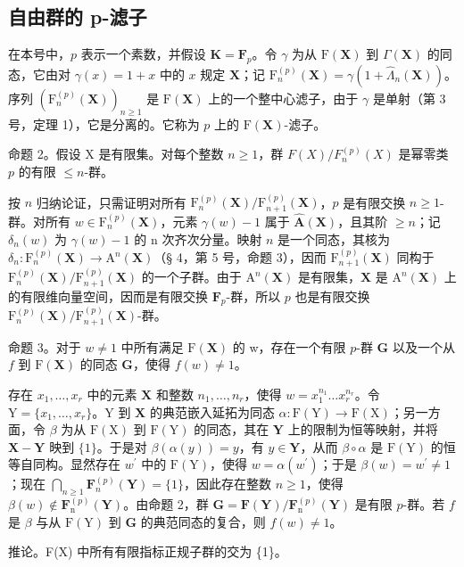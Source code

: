 \subsection{自由群的 p-滤子}

在本号中，\(p\) 表示一个素数，并假设 \(\mathbf{K} = \mathbf{F}_p\)。令 \(\gamma\) 为从 \(\mathrm{F}(\mathbf{X})\) 到 \(\Gamma(\mathbf{X})\) 的同态，它由对 \(\gamma(x) = 1 + x\) 中的 \(x\) 规定 \(\mathbf{X}\)；记 \(\mathrm{F}_n^{(p)}(\mathbf{X}) = \gamma(1 + \hat{\Lambda}_n(\mathbf{X}))\)。序列 \((\mathrm{F}_n^{(p)}(\mathbf{X}))_{n\geq 1}\) 是 \(\mathrm{F}(\mathbf{X})\) 上的一个整中心滤子，由于 \(\gamma\) 是单射（第 3 号，定理 1），它是分离的。它称为 \(p\) 上的 \(\mathrm{F}(\mathbf{X})\)-滤子。

命题 2。假设 X 是有限集。对每个整数 \(n \geqslant 1\)，群 \(F(X) / F_n^{(p)}(X)\) 是幂零类 \(p\) 的有限 \(\leqslant n\)-群。

按 \(n\) 归纳论证，只需证明对所有 \(\mathrm{F}_{n}^{(p)}(\mathbf{X}) / \mathrm{F}_{n + 1}^{(p)}(\mathbf{X})\)，\(p\) 是有限交换 \(n \geqslant 1\)-群。对所有 \(w \in \mathrm{F}_{n}^{(p)}(\mathbf{X})\)，元素 \(\gamma(w) - 1\) 属于 \(\hat{\mathbf{A}}(\mathbf{X})\)，且其阶 \(\geqslant n\)；记 \(\delta_n(w)\) 为 \(\gamma(w) - 1\) 的 n 次齐次分量。映射 \(n\) 是一个同态，其核为 \(\delta_n: \mathrm{F}_{n}^{(p)}(\mathbf{X}) \to \mathrm{A}^n (\mathbf{X})\)（§ 4，第 5 号，命题 3），因而 \(\mathrm{F}_{n + 1}^{(p)}(\mathbf{X})\) 同构于 \(\mathrm{F}_{n}^{(p)}(\mathbf{X}) / \mathrm{F}_{n + 1}^{(p)}(\mathbf{X})\) 的一个子群。由于 \(\mathrm{A}^n (\mathbf{X})\) 是有限集，\(\mathbf{X}\) 是 \(\mathrm{A}^n (\mathbf{X})\) 上的有限维向量空间，因而是有限交换 \(\mathbf{F}_p\)-群，所以 \(p\) 也是有限交换 \(\mathrm{F}_{n}^{(p)}(\mathbf{X}) / \mathrm{F}_{n + 1}^{(p)}(\mathbf{X})\)-群。

命题 3。对于 \(w \neq 1\) 中所有满足 \(\mathrm{F}(\mathbf{X})\) 的 w，存在一个有限 \(p\)-群 \(\mathbf{G}\) 以及一个从 \(f\) 到 \(\mathrm{F}(\mathbf{X})\) 的同态 \(\mathbf{G}\)，使得 \(f(w) \neq 1\)。

存在 \(x_{1},\ldots ,x_{r}\) 中的元素 \(\mathbf{X}\) 和整数 \(n_1,\dots ,n_r\)，使得 \(w = x_1^{n_1}\dots x_r^{n_r}\)。令 \(\mathrm{Y} = \{x_1,\dots,x_r\}\)。\(\mathrm{Y}\) 到 \(\mathbf{X}\) 的典范嵌入延拓为同态 \(\alpha : \mathrm{F}(\mathrm{Y})\to \mathrm{F}(\mathrm{X})\)；另一方面，令 \(\beta\) 为从 \(\mathrm{F}(\mathrm{X})\) 到 \(\mathrm{F}(\mathrm{Y})\) 的同态，其在 \(\mathbf{Y}\) 上的限制为恒等映射，并将 \(\mathbf{X} - \mathbf{Y}\) 映到 \(\{1\}\)。于是对 \(\beta (\alpha (y)) = y\)，有 \(y\in \mathbf{Y}\)，从而 \(\beta \circ \alpha\) 是 \(\mathrm{F}(\mathrm{Y})\) 的恒等自同构。显然存在 \(w^{\prime}\) 中的 \(\mathrm{F}(\mathrm{Y})\)，使得 \(w = \alpha (w^{\prime})\)；于是 \(\beta (w) = w^{\prime}\neq 1\)；现在 \(\bigcap_{n\geqslant 1}\mathbf{F}_n^{(p)}(\mathbf{Y}) = \{1\}\)，因此存在整数 \(n\geqslant 1\)，使得 \(\beta (w)\notin \mathbf{F}_{\mathrm{n}}^{(p)}(\mathbf{Y})\)。由命题 2，群 \(\mathbf{G} = \mathbf{F}(\mathbf{Y}) / \mathbf{F}_{\mathrm{n}}^{(p)}(\mathbf{Y})\) 是有限 \(p\)-群。若 \(f\) 是 \(\beta\) 与从 \(\mathrm{F}(\mathrm{Y})\) 到 \(\mathbf{G}\) 的典范同态的复合，则 \(f(w)\neq 1\)。

推论。F(X) 中所有有限指标正规子群的交为 \{1\}。

